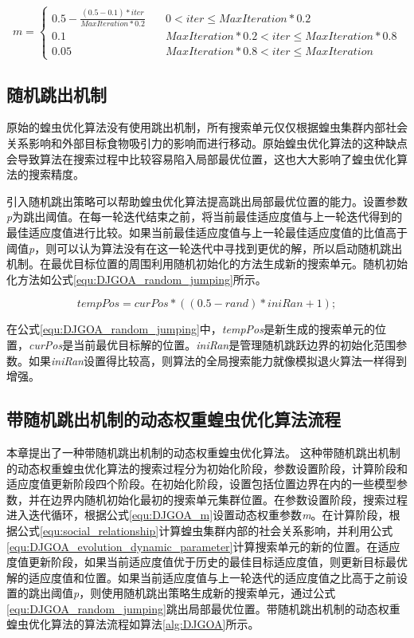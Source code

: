 \begin{equation}\label{equ:DJGOA_m}
    m= \begin{cases}
        0.5-\frac{(0.5-0.1)*iter}{MaxIteration*0.2} & \quad 0<iter\leq MaxIteration*0.2 \\
        0.1&\quad MaxIteration*0.2<iter \leq MaxIteration*0.8 \\
        0.05& \quad  MaxIteration*0.8 < iter \leq MaxIteration
        \end{cases} 
\end{equation}

\subsection{随机跳出机制}

原始的蝗虫优化算法没有使用跳出机制，所有搜索单元仅仅根据蝗虫集群内部社会关系影响和外部目标食物吸引力的影响而进行移动。原始蝗虫优化算法的这种缺点会导致算法在搜索过程中比较容易陷入局部最优位置，这也大大影响了蝗虫优化算法的搜索精度。

引入随机跳出策略可以帮助蝗虫优化算法提高跳出局部最优位置的能力。设置参数\emph{p}为跳出阈值。在每一轮迭代结束之前，将当前最佳适应度值与上一轮迭代得到的最佳适应度值进行比较。如果当前最佳适应度值与上一轮最佳适应度值的比值高于阈值\emph{p}，则可以认为算法没有在这一轮迭代中寻找到更优的解，所以启动随机跳出机制。在最优目标位置的周围利用随机初始化的方法生成新的搜索单元。随机初始化方法如公式\ref{equ:DJGOA_random_jumping}所示。

\begin{equation}\label{equ:DJGOA_random_jumping}
    tempPos=curPos*((0.5-rand)*iniRan+1);
\end{equation} 

在公式\ref{equ:DJGOA_random_jumping}中，\emph{tempPos}是新生成的搜索单元的位置，\emph{curPos}是当前最优目标解的位置。\emph{iniRan}是管理随机跳跃边界的初始化范围参数。如果\emph{iniRan}设置得比较高，则算法的全局搜索能力就像模拟退火算法一样得到增强。

\subsection{带随机跳出机制的动态权重蝗虫优化算法流程}

本章提出了一种带随机跳出机制的动态权重蝗虫优化算法。 这种带随机跳出机制的动态权重蝗虫优化算法的搜索过程分为初始化阶段，参数设置阶段，计算阶段和适应度值更新阶段四个阶段。在初始化阶段，设置包括位置边界在内的一些模型参数，并在边界内随机初始化最初的搜索单元集群位置。在参数设置阶段，搜索过程进入迭代循环，根据公式\ref{equ:DJGOA_m}设置动态权重参数\emph{m}。在计算阶段，根据公式\ref{equ:social_relationship}计算蝗虫集群内部的社会关系影响，并利用公式\ref{equ:DJGOA_evolution_dynamic_parameter}计算搜索单元的新的位置。在适应度值更新阶段，如果当前适应度值优于历史的最佳目标适应度值，则更新目标最优解的适应度值和位置。如果当前适应度值与上一轮迭代的适应度值之比高于之前设置的跳出阈值\emph{p}，则使用随机跳出策略生成新的搜索单元，通过公式\ref{equ:DJGOA_random_jumping}跳出局部最优位置。带随机跳出机制的动态权重蝗虫优化算法的算法流程如算法\ref{alg:DJGOA}所示。

